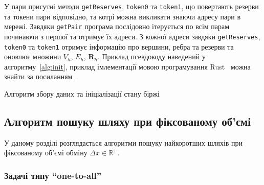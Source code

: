 \documentclass[../index.tex]{subfiles}
\begin{document}
У пари присутні методи \texttt{getReserves}, \texttt{token0} та \texttt{token1},
що повертають резерви та токени пари відповідно, та котрі можна викликати знаючи
адресу пари в мережі. Завдяки \texttt{getPair} програма послідовно ітерується по
всім парам починаючи з першої та отримує їх адреси. З кожної адреси завдяки
\texttt{getReserves}, \texttt{token0} та \texttt{token1} отримує інформацію про
вершини, ребра та резерви та оновлює множини $V_{h}$, $E_{h}$, $\mathbf{R}_{h}$. Приклад
псевдокоду навeдений у алгоритму~\ref{alg:init}, приклад імлементації мовою
програмування Rust~\cite{matsakis2014rust} можна знайти за
посиланням~\cite{Baibula_Constant_Product_Market_2024}.

\begin{algorithm}
\caption{Алгоритм збору даних та ініціалізації стану біржі}\label{alg:init}
\begin{algorithmic}
 

     

     
     

     

\EndFor{}
\end{algorithmic}
\end{algorithm}

\subsection{Алгоритм пошуку шляху при фіксованому об'ємі}

У даному розділі розглядається алгоритми пошуку найкоротших шляхів при
фіксованому об'ємі обміну $\Delta x \in \mathbb{R}^{+}$.

\subsubsection{Задачі типу ``one-to-all''}\label{sec:one-to-all}
\end{document}
